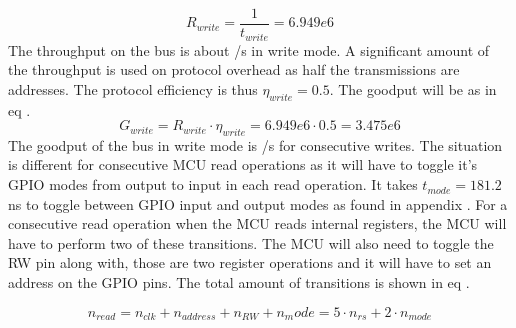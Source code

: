 \begin{equation}\label{eq:7_2_1_Write_ThroughPut3}
    R_{write} = \frac{1}{t_{write}} = 6.949e6 
\end{equation}
The throughput on the bus is about /s in write mode. A significant amount of the throughput is used on protocol overhead as half the transmissions are addresses. The protocol efficiency is thus $\eta_{write} = 0.5$. The goodput will be as in eq .
\begin{equation}\label{eq:7_2_1_Write_GoodPut}
    G_{write} = R_{write}\cdot \eta_{write} = 6.949e6 \cdot 0.5 = 3.475e6 
\end{equation}
The goodput of the bus in write mode is /s for consecutive writes. The situation is different for consecutive MCU read operations as it will have to toggle it's GPIO modes from output to input in each read operation. It takes $t_{mode} = 181.2$ns to toggle between GPIO input and output modes as found in appendix . For a consecutive read operation when the MCU reads internal registers, the MCU will have to perform two of these transitions. The MCU will also need to toggle the RW pin along with, those are two register operations and it will have to set an address on the GPIO pins. The total amount of transitions is shown in eq .

\begin{equation}\label{eq:7_2_1_Read_Register1}
    n_{read} = n_{clk} + n_{address} + n_{RW} + {n_mode} = 5 \cdot n_{rs} + 2 \cdot n_{mode} 
\end{equation}

